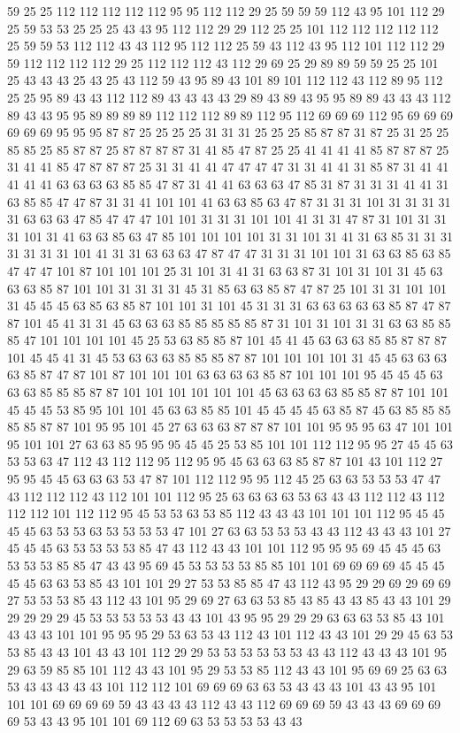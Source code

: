 59 25 25 112 112 112 112 112 95 95 112 112 29 25 59 59 59 112 43 95 101 112 29 25 59 53 53 25 25 25 43 43 95 112 112 29 29 112 25 25 101 112 112 112 112 112 25 59 59 53 112 112 43 43 112 95 112 112 25 59 43 112 43 95 112 101 112 112 29 59 112 112 112 112 29 25 112 112 112 43 112 29 69 25 29 89 89 59 59 25 25 101 25 43 43 43 25 43 25 43 112 59 43 95 89 43 101 89 101 112 112 43 112 89 95 112 25 25 95 89 43 43 112 112 89 43 43 43 43 29 89 43 89 43 95 95 89 89 43 43 43 112 89 43 43 95 95 89 89 89 89 112 112 112 89 89 112 95 112 69 69 69 112 95 69 69 69 69 69 69 95 95 95 87 87 25 25 25 25 31 31 31 25 25 25 85 87 87 31 87 25 31 25 25 85 85 25 85 87 87 25 87 87 87 87 31 41 85 47 87 25 25 41 41 41 41 85 87 87 87 25 31 41 41 85 47 87 87 87 25 31 31 41 41 47 47 47 47 31 31 41 41 31 85 87 31 41 41 41 41 41 63 63 63 63 85 85 47 87 31 41 41 63 63 63 47 85 31 87 31 31 31 41 41 31 63 85 85 47 47 87 31 31 41 101 101 41 63 63 85 63 47 87 31 31 31 101 31 31 31 31 31 63 63 63 47 85 47 47 47 101 101 31 31 31 101 101 41 31 31 47 87 31 101 31 31 31 101 31 41 63 63 85 63 47 85 101 101 101 101 31 31 101 31 41 31 63 85 31 31 31 31 31 31 31 101 41 31 31 63 63 63 47 87 47 47 31 31 31 101 101 31 63 63 85 63 85 47 47 47 101 87 101 101 101 25 31 101 31 41 31 63 63 87 31 101 31 101 31 45 63 63 63 85 87 101 101 31 31 31 31 45 31 85 63 63 85 87 47 87 25 101 31 31 101 101 31 45 45 45 63 85 63 85 87 101 101 31 101 45 31 31 31 63 63 63 63 63 85 87 47 87 87 101 45 41 31 31 45 63 63 63 85 85 85 85 85 87 31 101 31 101 31 31 63 63 85 85 85 47 101 101 101 101 45 25 53 63 85 85 87 101 45 41 45 63 63 63 85 85 87 87 87 101 45 45 41 31 45 53 63 63 63 85 85 85 87 87 101 101 101 101 31 45 45 63 63 63 63 85 87 47 87 101 87 101 101 101 63 63 63 63 85 87 101 101 101 95 45 45 45 63 63 63 85 85 85 87 87 101 101 101 101 101 101 45 63 63 63 63 85 85 87 87 101 101 45 45 45 53 85 95 101 101 45 63 63 85 85 101 45 45 45 45 63 85 87 45 63 85 85 85 85 85 87 87 101 95 95 101 45 27 63 63 63 87 87 87 101 101 95 95 95 63 47 101 101 95 101 101 27 63 63 85 95 95 95 45 45 25 53 85 101 101 112 112 95 95 27 45 45 63 53 53 63 47 112 43 112 112 95 112 95 95 45 63 63 63 85 87 87 101 43 101 112 27 95 95 45 45 63 63 63 53 47 87 101 112 112 95 95 112 45 25 63 63 53 53 53 47 47 43 112 112 112 43 112 101 101 112 95 25 63 63 63 63 53 63 43 43 112 112 43 112 112 112 101 112 112 95 45 53 53 63 53 85 112 43 43 43 101 101 101 112 95 45 45 45 45 63 53 53 63 53 53 53 53 47 101 27 63 63 53 53 53 43 43 112 43 43 43 101 27 45 45 45 63 53 53 53 53 85 47 43 112 43 43 101 101 112 95 95 95 69 45 45 45 63 53 53 53 85 85 47 43 43 95 69 45 53 53 53 53 85 85 101 101 69 69 69 69 45 45 45 45 45 63 63 53 85 43 101 101 29 27 53 53 85 85 47 43 112 43 95 29 29 69 29 69 69 27 53 53 53 85 43 112 43 101 95 29 69 27 63 63 53 85 43 85 43 43 85 43 43 101 29 29 29 29 29 45 53 53 53 53 53 43 43 101 43 95 95 29 29 29 63 63 63 53 85 43 101 43 43 43 101 101 95 95 95 29 53 63 53 43 112 43 101 112 43 43 101 29 29 45 63 53 53 85 43 43 101 43 43 101 112 29 29 53 53 53 53 53 53 43 43 112 43 43 43 101 95 29 63 59 85 85 101 112 43 43 101 95 29 53 53 85 112 43 43 101 95 69 69 25 63 63 53 43 43 43 43 43 101 112 112 101 69 69 69 63 63 53 43 43 43 101 43 43 95 101 101 101 69 69 69 69 59 43 43 43 43 112 43 43 112 69 69 69 59 43 43 43 69 69 69 69 53 43 43 95 101 101 69 112 69 63 53 53 53 53 43 43 